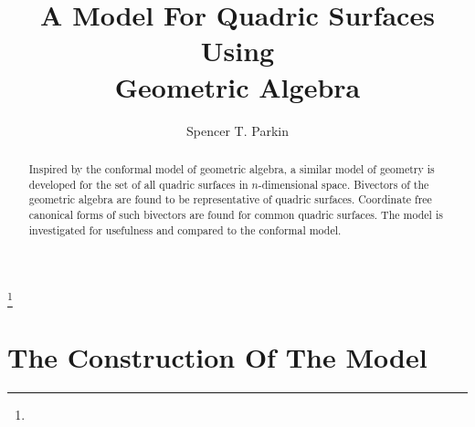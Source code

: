 \documentclass{ecgd-l}
\theoremstyle{definition}
\theoremstyle{remark}
\numberwithin{equation}{section}
\begin{document}
\title{A Model For Quadric Surfaces\\Using\\Geometric Algebra}


\author{Spencer T. Parkin}
\address{102 West 500 South, Salt Lake City, Utah  84101}
\curraddr{}
\thanks{}



\date{}

\dedicatory{}

\begin{abstract}
Inspired by the conformal model of geometric algebra,
a similar model of geometry is developed for the set
of all quadric surfaces in $n$-dimensional space.  Bivectors of the geometric algebra
are found to be representative of quadric surfaces.  Coordinate free canonical forms
of such bivectors are found for common quadric surfaces.  The model is investigated
for usefulness and compared to the conformal model.
\end{abstract}

\maketitle


\section{The Construction Of The Model}
\end{document}
